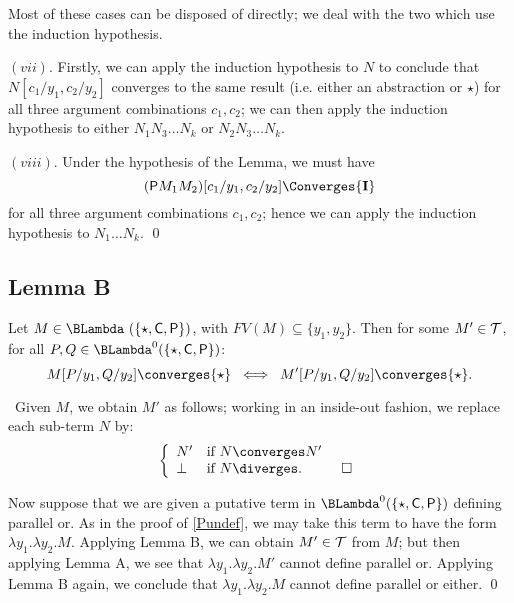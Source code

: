 Most of these cases can be disposed of directly; we deal with the two which use the induction hypothesis.

$(vii)$. Firstly, we can apply the induction hypothesis to $N$ to conclude that $N[c_{1} / y_{1}, c_{2} / y_{2}]$ 
converges to the same result (i.e. either an abstraction or $\star$) 
for all three argument combinations $c_{1}, c_{2}$; 
we can then apply the induction hypothesis to either $N_{1} N_{3} \ldots N_{k}$ or $N_{2} N_{3} \ldots N_{k}$.

$(viii)$. Under the hypothesis of the Lemma, we must have 
\[ ({\sf P} M_{1} M_{2})[c_{1} / y_{1}, c_{2} / y_{2}] \Converges {\bf I} \]
for all three argument combinations $c_{1}, c_{2}$; hence we can apply the induction hypothesis to $N_{1} \ldots N_{k}$. \qed

\subsection*{Lemma B}
Let $M \in \BLambda\ ( \{ \star , {\sf C} , {\sf P} \} )$, with $FV(M) \subseteq \{ y_{1}, y_{2} \}$. 
Then for some $M' \in {\cal T}$, for all $P, Q \in {\BLambda}^{0} ( \{ \star , {\sf C} , {\sf P} \} )$:
\[ M [ P / y_{1} , Q / y_{2} ] \converges {\star} \;\; \Longleftrightarrow \;\;  M' [ P / y_{1} , Q / y_{2} ] \converges {\star} . \]

\proof\ Given $M$, we obtain $M'$ as follows; working in an inside-out fashion, we replace each sub-term $N$ by:
\[ \left\{ \begin{array}{ll}
N' & \mbox{if $N \converges N'$} \\
\bot & \mbox{if $N \diverges$.} \;\;\; \qed
\end{array} \right. \]

Now suppose that we are given a putative term in ${\BLambda}^{0} ( \{ \star , {\sf C} , {\sf P} \} )$ defining parallel or. 
As in the proof of \ref{Pundef}, we may take this term to have the form $\lambda y_{1} . \lambda y_{2} . M$. 
Applying Lemma B, we can obtain $M' \in {\cal T}$ from $M$; but then applying Lemma A, we see that $\lambda y_{1} . \lambda y_{2} . M'$ 
cannot define parallel or. 
Applying Lemma B again, we conclude that $\lambda y_{1} . \lambda y_{2} . M$ cannot define parallel or either. \qed
